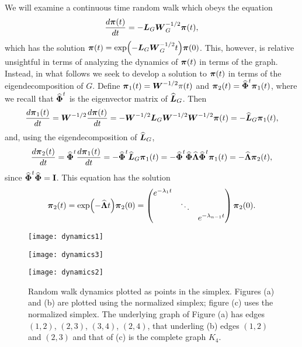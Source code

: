 We will examine a continuous time random walk which  obeys the equation 
\begin{equation*}
\frac{d \boldsymbol{\pi}(t)}{dt } = -\vb*{L}_G\vb*{W}_G^{-1/2} \boldsymbol{\pi}(t),
\end{equation*}
which has the solution $\boldsymbol{\pi}(t)  = \exp(-\vb*{L}_G\vb*{W}_G^{-1/2}t)\boldsymbol{\pi}(0)$. This, however, is relative unsightful in terms of  analyzing the dynamics of $\boldsymbol{\pi}(t)$ in terms of the  graph.  Instead, in  what follows we seek  to develop a solution to $\boldsymbol{\pi}(t)$ in terms of the  eigendecomposition of  $G$.  Define $\boldsymbol{\pi}_1(t) = \vb*{W}^{-1/2}\pi(t)$ and $\boldsymbol{\pi}_2(t) = \widehat{\boldsymbol{\Phi}}^t \boldsymbol{\pi}_1(t)$, where we recall that $\widehat{\boldsymbol{\Phi}}^t$ is the eigenvector matrix  of  $\widehat{\vb*{L}}_G$.  Then 
\begin{equation*}
\frac{d \boldsymbol{\pi}_1(t)}{dt} = \vb*{W}^{-1/2}\frac{d \boldsymbol{\pi}(t)}{dt} = -\vb*{W}^{-1/2}\vb*{L}_G\vb*{W}^{-1/2}\vb*{W}^{-1/2}\boldsymbol{\pi}(t) = - \widehat{\vb*{L}}_G\boldsymbol{\pi}_1(t),
\end{equation*}
and, using the eigendecomposition of $\widehat{\vb*{L}}_G$,   
\begin{equation*}
\frac{ d\boldsymbol{\pi}_2(t)}{dt} = \widehat{\boldsymbol{\Phi}}^t \frac{d\boldsymbol{\pi}_1(t)}{dt} = -\widehat{\boldsymbol{\Phi}}^t \widehat{\vb*{L}}_G \boldsymbol{\pi}_1(t) = -\widehat{\boldsymbol{\Phi}}^t \widehat{\boldsymbol{\Phi}}\widehat{\vb{\Lambda}}\widehat{\boldsymbol{\Phi}}^t \boldsymbol{\pi}_1(t) = -\widehat{\vb{\Lambda}}  \boldsymbol{\pi}_2(t),
\end{equation*}
since  $\widehat{\boldsymbol{\Phi}}^t\widehat{\boldsymbol{\Phi}}=\vb{I}$. This equation  has the solution 
\begin{equation*}
\boldsymbol{\pi}_2(t) = \exp(-\widehat{\vb{\Lambda}} t)\boldsymbol{\pi}_2(0) = \begin{pmatrix}
e^{-\lambda_1 t}  & &\\
& \ddots  & \\
&& e^{-\lambda_{n-1} t}
\end{pmatrix}  \boldsymbol{\pi}_2(0).
\end{equation*}

\begin{figure}
	\centering
	\begin{minipage}{0.32\textwidth}
		\centering
		\texttt{[image: dynamics1]}
		\subcaption{}
	\end{minipage}
	\begin{minipage}{0.32\textwidth}
		\centering
		\texttt{[image: dynamics3]}
		\subcaption{}
	\end{minipage}
	\begin{minipage}{0.32\textwidth}
		\centering
		\texttt{[image: dynamics2]}
		\subcaption{}
	\end{minipage}
	\caption{Random walk dynamics plotted as points  in the simplex. Figures (a) and (b) are plotted using the normalized simplex;  figure (c) uses  the normalized simplex. The  underlying graph of Figure (a) has edges $(1,2)$, $(2,3)$, $(3,4)$, $(2,4)$, that underling (b) edges $(1,2)$ and $(2,3)$ and that of (c) is the complete graph  $K_4$. }
	\label{fig:random_walk}
\end{figure}

